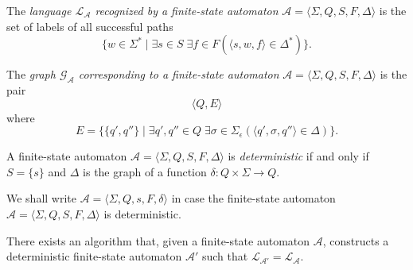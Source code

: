 \begin{definition}
  The \emph{language $\mathcal{L}_\mathcal{A}$ recognized by a finite-state
  automaton} $\mathcal{A} = \langle \Sigma, Q, S, F, \Delta \rangle$ is the set of
  labels of all successful paths
  \begin{equation*}
    \{ w \in \Sigma^* \mid \exists s \in S \; \exists f \in F (\langle s, w, f
    \rangle \in \Delta^*) \}.
  \end{equation*}
\end{definition}

\begin{definition}
  The \emph{graph $\mathcal{G}_{\mathcal{A}}$ corresponding to a finite-state
  automaton} $\mathcal{A} = \langle \Sigma, Q, S, F, \Delta \rangle$ is the pair
  \begin{equation*}
    \langle Q, E \rangle
  \end{equation*}
  where
  \begin{equation*}
    E = \{ \{ q', q'' \} \mid \exists q', q'' \in Q \; \exists \sigma \in
    \Sigma_\epsilon (\langle q', \sigma, q'' \rangle \in \Delta) \}.
  \end{equation*}
\end{definition}

\begin{definition}
  A finite-state automaton $\mathcal{A} = \langle \Sigma, Q, S, F, \Delta \rangle$ is
  \emph{determi\-nistic} if and only if $S = \{ s \}$ and  $\Delta$ is the graph of a
  function $\delta : Q \times \Sigma \rightarrow Q$.
\end{definition}

We shall write $\mathcal{A} = \langle \Sigma, Q, s, F, \delta \rangle$ in case the
finite-state automaton $\mathcal{A} = \langle \Sigma, Q, S, F, \Delta \rangle$ is
deterministic.

\begin{theorem}
  \label{thm:rabin_scott}
  There exists an algorithm that, given a finite-state automaton $\mathcal{A}$,
  constructs a deterministic finite-state automaton $\mathcal{A'}$ such that
  $\mathcal{L}_\mathcal{A'} = \mathcal{L}_\mathcal{A}$.
\end{theorem}
